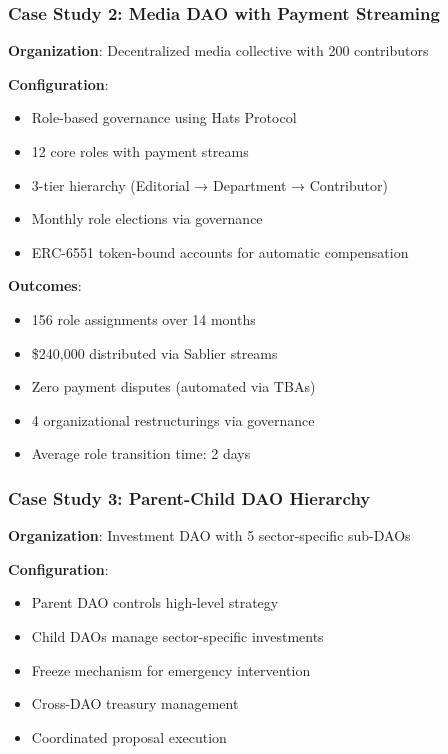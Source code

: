 \documentclass[11pt,a4paper]{article}
\begin{document}
\subsubsection{Case Study 2: Media DAO with Payment Streaming}

\textbf{Organization}: Decentralized media collective with 200 contributors

\textbf{Configuration}:
\begin{itemize}
    \item Role-based governance using Hats Protocol
    \item 12 core roles with payment streams
    \item 3-tier hierarchy (Editorial → Department → Contributor)
    \item Monthly role elections via governance
    \item ERC-6551 token-bound accounts for automatic compensation
\end{itemize}

\textbf{Outcomes}:
\begin{itemize}
    \item 156 role assignments over 14 months
    \item \$240,000 distributed via Sablier streams
    \item Zero payment disputes (automated via TBAs)
    \item 4 organizational restructurings via governance
    \item Average role transition time: 2 days
\end{itemize}

\subsubsection{Case Study 3: Parent-Child DAO Hierarchy}

\textbf{Organization}: Investment DAO with 5 sector-specific sub-DAOs

\textbf{Configuration}:
\begin{itemize}
    \item Parent DAO controls high-level strategy
    \item Child DAOs manage sector-specific investments
    \item Freeze mechanism for emergency intervention
    \item Cross-DAO treasury management
    \item Coordinated proposal execution
\end{itemize}
\end{document}
